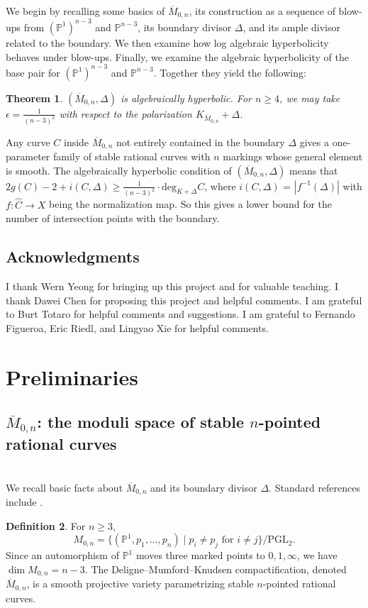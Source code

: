 \documentclass{amsart}
\newtheorem{theorem}{Theorem}[section]
\theoremstyle{definition}
\newtheorem{definition}[theorem]{Definition}
\theoremstyle{remark}
\newcommand{\PP}{\mathbb{P}}
\begin{document}
We begin by recalling some basics of $\overline{M}_{0,n}$, its construction as a sequence of blow-ups from $(\PP^1)^{n-3}$ and $\mathbb P^{n-3}$, its boundary divisor $\Delta$, and its ample divisor related to the boundary. We then examine how log algebraic hyperbolicity behaves under blow-ups. Finally, we examine the algebraic hyperbolicity of the base pair for $(\PP^1)^{n-3}$ and $\mathbb P^{n-3}$. Together they yield the following:
\begin{theorem}
$(\overline{M}_{0,n}, \Delta)$ is algebraically hyperbolic. For $n\geq 4$, we may take $\epsilon = \frac 1{(n-3)^2}$ with respect to the polarization $K_{\overline{M}_{0,n}}+\Delta$.
\end{theorem}

Any curve $C$ inside $\overline{M}_{0,n}$ not entirely contained in the boundary $\Delta$ gives a one-parameter family of stable rational curves with $n$ markings whose general element is smooth. The algebraically hyperbolic condition of $(\overline{M}_{0,n}, \Delta)$ means that $2g(C)-2+i(C,\Delta)\geq\frac1{(n-3)^2}\cdot \mathrm{deg}_{K+\Delta}C$, where $i(C,\Delta)$ = $|f^{-1}(\Delta)|$ with $f:\widehat{C}\to X$ being the normalization map. So this gives a lower bound for the number of intersection points with the boundary. 

\subsection*{Acknowledgments}
I thank Wern Yeong for bringing up this project and for valuable teaching. I thank Dawei Chen for proposing this project and helpful comments. I am grateful to Burt Totaro for helpful comments and suggestions. I am grateful to Fernando Figueroa, Eric Riedl, and Lingyao Xie for helpful comments.

\section{Preliminaries}
\subsection{$\overline{M}_{0,n}$: the moduli space of stable \(n\)-pointed rational curves}\mbox{}\\

We recall basic facts about $\overline{M}_{0,n}$ and its boundary divisor $\Delta$. Standard references include \cite{Knudsen1983, keel1992intersection}.
\begin{definition}
For \(n\ge 3\),
\[
M_{0,n}
= \{(\mathbb P^1,p_1,\ldots,p_n) \mid p_i \neq p_j \text{ for } i\neq j\}/\mathrm{PGL}_2.
\]
Since an automorphism of \(\mathbb{P}^1\) moves three marked points to \(0,1,\infty\), we have \(\dim M_{0,n}=n-3\).
The Deligne–Mumford–Knudsen compactification, denoted \(\overline{M}_{0,n}\), is a smooth projective variety parametrizing stable \(n\)-pointed rational curves.
\end{definition}
\end{document}
